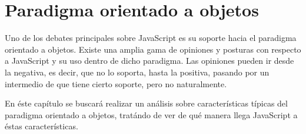 \chapter{Paradigma orientado a objetos}

\label{ch:poo}


Uno de los debates principales sobre JavaScript es su soporte hacia el paradigma orientado a objetos. Existe una amplia gama de opiniones y posturas con respecto a JavaScript y su uso dentro de dicho paradigma. Las opiniones pueden ir desde la negativa, es decir, que no lo soporta, hasta la positiva, pasando por un intermedio de que tiene cierto soporte, pero no naturalmente.

En éste capítulo se buscará realizar un análisis sobre características típicas del paradigma orientado a objetos, tratándo de ver de qué manera llega JavaScript a éstas características.









